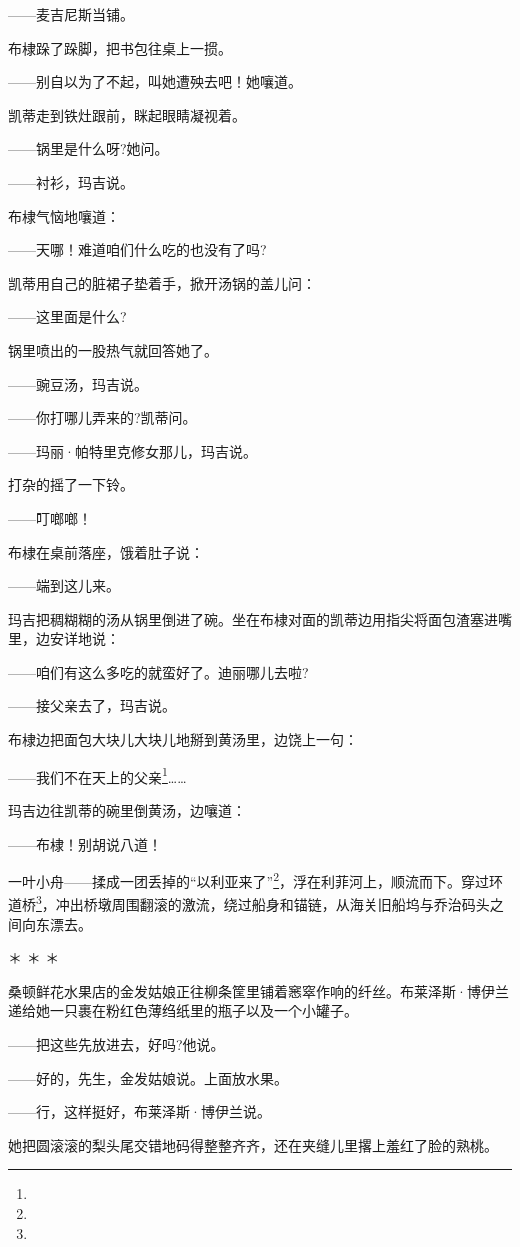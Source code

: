 \par ——麦吉尼斯当铺。
\par 布棣跺了跺脚，把书包往桌上一掼。
\par ——别自以为了不起，叫她遭殃去吧！她嚷道。
\par 凯蒂走到铁灶跟前，眯起眼睛凝视着。
\par ——锅里是什么呀?她问。
\par ——衬衫，玛吉说。
\par 布棣气恼地嚷道：
\par ——天哪！难道咱们什么吃的也没有了吗?
\par 凯蒂用自己的脏裙子垫着手，掀开汤锅的盖儿问：
\par ——这里面是什么?
\par 锅里喷出的一股热气就回答她了。
\par ——豌豆汤，玛吉说。
\par ——你打哪儿弄来的?凯蒂问。
\par ——玛丽·帕特里克修女那儿，玛吉说。
\par 打杂的摇了一下铃。
\par ——叮啷啷！
\par 布棣在桌前落座，饿着肚子说：
\par ——端到这儿来。
\par 玛吉把稠糊糊的汤从锅里倒进了碗。坐在布棣对面的凯蒂边用指尖将面包渣塞进嘴里，边安详地说：
\par ——咱们有这么多吃的就蛮好了。迪丽哪儿去啦?
\par ——接父亲去了，玛吉说。
\par 布棣边把面包大块儿大块儿地掰到黄汤里，边饶上一句：
\par ——我们不在天上的父亲\footnote{}……
\par 玛吉边往凯蒂的碗里倒黄汤，边嚷道：
\par ——布棣！别胡说八道！
\par 一叶小舟——揉成一团丢掉的“以利亚来了”\footnote{}，浮在利菲河上，顺流而下。穿过环道桥\footnote{}，冲出桥墩周围翻滚的激流，绕过船身和锚链，从海关旧船坞与乔治码头之间向东漂去。
\par ＊ ＊ ＊
\par 桑顿鲜花水果店的金发姑娘正往柳条筐里铺着窸窣作响的纤丝。布莱泽斯·博伊兰递给她一只裹在粉红色薄绉纸里的瓶子以及一个小罐子。
\par ——把这些先放进去，好吗?他说。
\par ——好的，先生，金发姑娘说。上面放水果。
\par ——行，这样挺好，布莱泽斯·博伊兰说。
\par 她把圆滚滚的梨头尾交错地码得整整齐齐，还在夹缝儿里撂上羞红了脸的熟桃。
